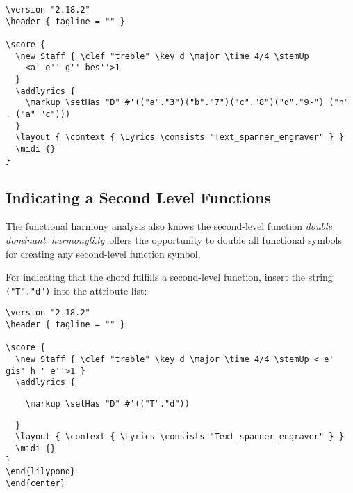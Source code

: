 \documentclass[
  DIV=calc,
  BCOR=5mm,
  12pt,
  headings=small,
  oneside,
  abstract=true,
  toc=bib,
  xcolor=dvipsnames,
  openany,
  english]{scrartcl}
\newcommand{\acc}[0]{\textit}
\newcommand{\hlyn}[0]{\textit{harmonyli.ly}}
\begin{document}
\begin{scriptsize}
\begin{verbatim}
\version "2.18.2"
\header { tagline = "" }

\score {
  \new Staff { \clef "treble" \key d \major \time 4/4 \stemUp
    <a' e'' g'' bes''>1
  }
  \addlyrics {
    \markup \setHas "D" #'(("a"."3")("b"."7")("c"."8")("d"."9-") ("n" . ("a" "c")))
  }
  \layout { \context { \Lyrics \consists "Text_spanner_engraver" } }
  \midi {}
}
\end{verbatim}
\end{scriptsize}

\subsection{Indicating a Second Level Functions}

The functional harmony analysis also knows the second-level function \acc{double
dominant}. \hlyn\ offers the opportunity to double all functional symbols for
creating any second-level function symbol.

For indicating that the chord fulfills a second-level function, insert the string
\texttt{("T"."d")} into the attribute list:

\begin{center}
\end{center}

\begin{scriptsize}
\begin{verbatim}
\version "2.18.2"
\header { tagline = "" }

\score {
  \new Staff { \clef "treble" \key d \major \time 4/4 \stemUp < e' gis' h'' e''>1 }
  \addlyrics {
\end{verbatim}
{ \color{red} \verb|    \markup \setHas "D" #'(("T"."d"))| }
\begin{verbatim}
  }
  \layout { \context { \Lyrics \consists "Text_spanner_engraver" } }
  \midi {}
}
\end{lilypond}
\end{center}
\end{verbatim}
\end{scriptsize}
\end{document}
